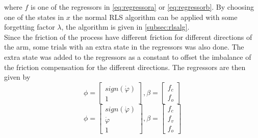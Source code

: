 \documentclass[10pt,a4paper]{article}
\begin{document}
where $f$ is one of the regressors in \ref{eq:regressora} or \ref{eq:regressorb}. By choosing one of the states in $x$ the normal RLS algorithm can be applied with some forgetting factor $\lambda$, the algorithm is given in \ref{subsec:rlsalg}.
\\
Since the friction of the process have different friction for different directions of the arm, some trials with an extra state in the regressors was also done. The extra state was added to the regressors as a constant to offset the imbalance of the friction compensation for the different directions. The regressors are then given by 
\begin{equation}
\phi=\begin{bmatrix}
sign(\dot{\varphi}) \\
1
\end{bmatrix}, \beta = \begin{bmatrix}
f_c\\
f_o
\end{bmatrix}
\label{eq:regressorao}
\end{equation}
\begin{equation}
\phi=\begin{bmatrix}
sign(\dot{\varphi}) \\
\dot{\varphi} \\
1
\end{bmatrix}, \beta = \begin{bmatrix}
f_c\\
f_v\\
f_o
\end{bmatrix}
\label{eq:regressorbo}
\end{equation} 


\end{document}
